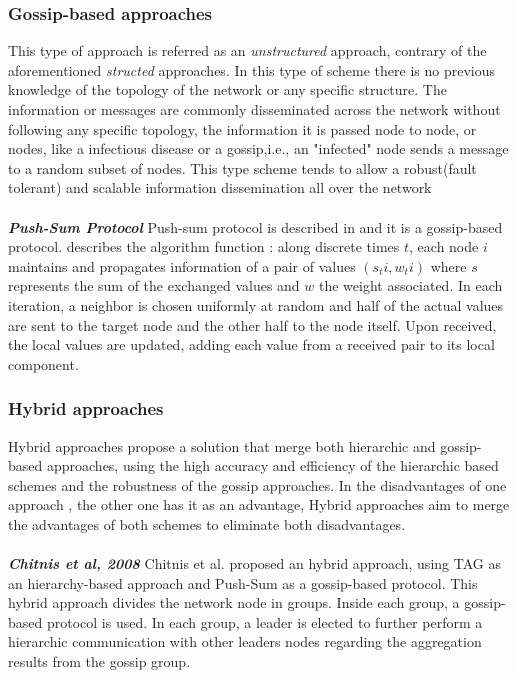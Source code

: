 \subsubsection{Gossip-based approaches}
This type of approach is referred as an \textit{unstructured} approach, contrary of the aforementioned \textit{structed} approaches. In this type of scheme there is no previous knowledge of the topology of the network or any specific structure. The information or messages are commonly disseminated across the network without following any specific topology, the information it is passed node to node, or nodes, like a infectious disease or a gossip,i.e., an "infected" node sends a message to a random subset of nodes. This type scheme tends to allow a robust(fault tolerant) and scalable information dissemination all over the network\cite{journals/corr/abs-1110-0725}\\
\\
\textbf{\textit{Push-Sum Protocol}}  Push-sum protocol is described in \cite{kempe2003gossip} and it is a gossip-based protocol. \cite{journals/corr/abs-1110-0725} describes the algorithm function : along discrete times $t$, each node $i$ maintains and propagates information of a pair of values $(s_ti,w_ti)$ where $s$ represents the sum of the exchanged values and $w$ the weight associated. In each iteration, a neighbor is chosen uniformly at random and half of the actual values are sent to the target node and the other half to the node itself. Upon received, the local values are updated, adding each value from a received pair to its local component.

\subsubsection{Hybrid approaches} 
Hybrid approaches propose a solution that merge both hierarchic and gossip-based approaches, using the high accuracy and efficiency of the hierarchic based schemes and the robustness of the gossip approaches. In the disadvantages of one approach , the other one has it as an advantage, Hybrid approaches aim to merge the advantages of both schemes to eliminate both disadvantages.\\
\\
\textbf{\textit{Chitnis et al, 2008}} Chitnis et al.\cite{chitnis2008aggregation} proposed an hybrid approach, using TAG as an hierarchy-based approach and Push-Sum as a gossip-based protocol. This hybrid approach divides the network node in groups. Inside each group, a gossip-based protocol is used. In each group, a leader is elected to further perform a hierarchic communication with other  leaders nodes regarding the aggregation results from the gossip group. 

